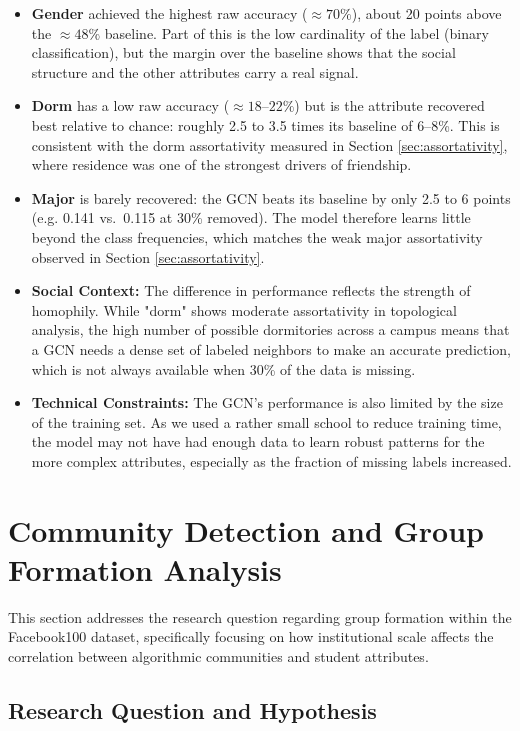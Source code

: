 \documentclass[12pt]{article}
\begin{document}
\begin{itemize}
    \item \textbf{Gender} achieved the highest raw accuracy ($\approx 70\%$), about 20 points above the $\approx 48\%$ baseline. Part of this is the low cardinality of the label (binary classification), but the margin over the baseline shows that the social structure and the other attributes carry a real signal.
    \item \textbf{Dorm} has a low raw accuracy ($\approx 18$--$22\%$) but is the attribute recovered best relative to chance: roughly 2.5 to 3.5 times its baseline of 6--8\%. This is consistent with the dorm assortativity measured in Section \ref{sec:assortativity}, where residence was one of the strongest drivers of friendship.
    \item \textbf{Major} is barely recovered: the GCN beats its baseline by only 2.5 to 6 points (e.g. 0.141 vs.\ 0.115 at 30\% removed). The model therefore learns little beyond the class frequencies, which matches the weak major assortativity observed in Section \ref{sec:assortativity}.
    \item \textbf{Social Context:} The difference in performance reflects the strength of homophily. While "dorm" shows moderate assortativity in topological analysis, the high number of possible dormitories across a campus means that a GCN needs a dense set of labeled neighbors to make an accurate prediction, which is not always available when 30\% of the data is missing.
    \item \textbf{Technical Constraints:} The GCN's performance is also limited by the size of the training set. As we used a rather small school to reduce training time, the model may not have had enough data to learn robust patterns for the more complex attributes, especially as the fraction of missing labels increased.
\end{itemize}

\section{Community Detection and Group Formation Analysis}
\label{sec:community_detection}

This section addresses the research question regarding group formation within the Facebook100 dataset, specifically focusing on how institutional scale affects the correlation between algorithmic communities and student attributes.

\subsection*{Research Question and Hypothesis}
\end{document}
